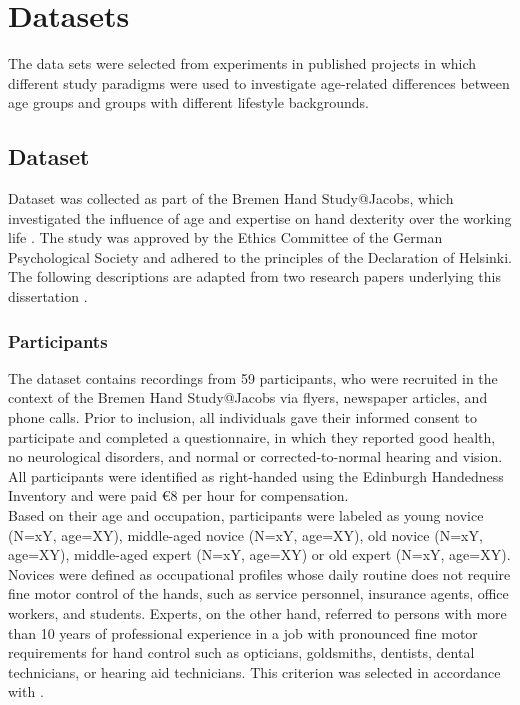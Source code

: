 \section{Datasets}
The data sets were selected from experiments in published projects in which different study paradigms were used to investigate age-related differences between age groups and groups with different lifestyle backgrounds.

\subsection{Dataset }
\label{methods:datasets:I}
Dataset  was collected as part of the Bremen Hand Study@Jacobs, which investigated the influence of age and expertise on hand dexterity over the working life \cite{Voelcker-Rehage2013}. The study was approved by the Ethics Committee of the German Psychological Society and adhered to the principles of the Declaration of Helsinki. The following descriptions are adapted from two research papers underlying this dissertation \cite{Gaidai2022, Goelz2021a}.

\subsubsection{Participants}
\label{methods:datasets:I:participants}
The dataset contains recordings from 59 participants, who were recruited in the context of the Bremen Hand Study@Jacobs via flyers, newspaper articles, and phone calls. Prior to inclusion, all individuals gave their informed consent to participate and completed a questionnaire, in which they reported good health, no neurological disorders, and normal or corrected-to-normal hearing and vision. All participants were identified as right-handed using the Edinburgh Handedness Inventory \cite{Oldfield1971} and were paid \euro{8} per hour for compensation.\\
Based on their age and occupation, participants were labeled as young novice (N=xY, age=XY), middle-aged novice (N=xY, age=XY), old novice (N=xY, age=XY), middle-aged expert (N=xY, age=XY) or old expert (N=xY, age=XY). Novices were defined as occupational profiles whose daily routine does not require fine motor control of the hands, such as service personnel, insurance agents, office workers, and students. Experts, on the other hand, referred to persons with more than 10 years of professional experience in a job with pronounced fine motor requirements for hand control such as opticians, goldsmiths, dentists, dental technicians, or hearing aid technicians. This criterion was selected in accordance with \cite{Ericsson1991}. 

